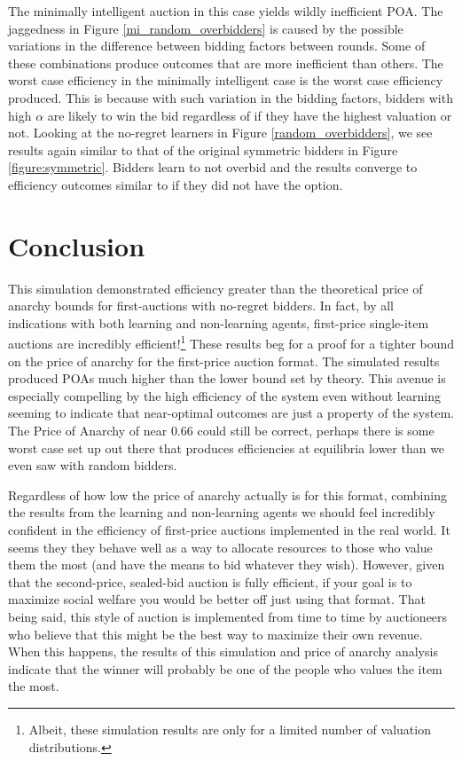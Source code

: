\documentclass[12pt,twoside]{reedthesis}
\begin{document}
The minimally intelligent auction in this case yields wildly inefficient POA. The jaggedness in Figure \ref{mi_random_overbidders} is caused by the possible variations in the difference between bidding factors between rounds. Some of these combinations produce outcomes that are more inefficient than others. The worst case efficiency in the minimally intelligent case is the worst case efficiency produced. This is because with such variation in the bidding factors, bidders with high $\alpha$ are likely to win the bid regardless of if they have the highest valuation or not. Looking at the no-regret learners in Figure \ref{random_overbidders}, we see results again similar to that of the original symmetric bidders in Figure \ref{figure:symmetric}. Bidders learn to not overbid and the results converge to efficiency outcomes similar to if they did not have the option.



\chapter*{Conclusion}
	\setcounter{chapter}{4}
	\setcounter{section}{0}
	
This simulation demonstrated efficiency greater than the theoretical price of anarchy bounds for first-auctions with no-regret bidders. In fact, by all indications with both learning and non-learning agents, first-price single-item auctions are incredibly efficient!\footnote{Albeit, these simulation results are only for a limited number of valuation distributions.} These results beg for a proof for a tighter bound on the price of anarchy for the first-price auction format. The simulated results produced POAs much higher than the lower bound set by theory. This avenue is especially compelling by the high efficiency of the system even without learning seeming to indicate that near-optimal outcomes are just a property of the system. The Price of Anarchy of near $0.66$ could still be correct, perhaps there is some worst case set up out there that produces efficiencies at equilibria lower than we even saw with random bidders. 

Regardless of how low the price of anarchy actually is for this format, combining the results from the learning and non-learning agents we should feel incredibly confident in the efficiency of first-price auctions implemented in the real world. It seems they they behave well as a way to allocate resources to those who value them the most (and have the means to bid whatever they wish). However, given that the second-price, sealed-bid auction is fully efficient, if your goal is to maximize social welfare you would be better off just using that format. That being said, this style of auction is implemented from time to time by auctioneers who believe that this might be the best way to maximize their own revenue. When this happens, the results of this simulation and price of anarchy analysis indicate that the winner will probably be one of the people who values the item the most. 
\end{document}
